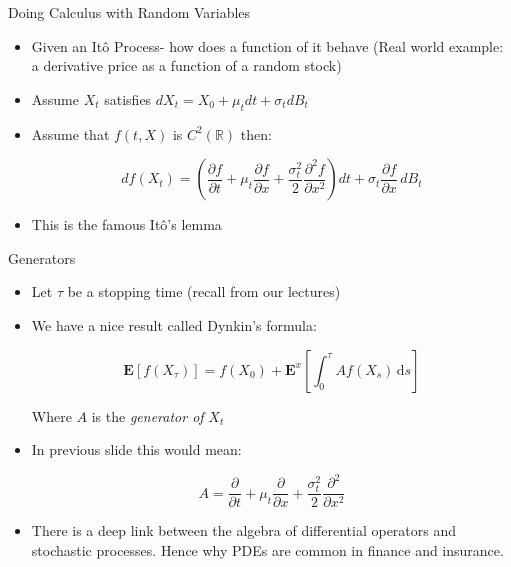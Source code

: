 \documentclass[11pt]{beamer}
\begin{document}
\begin{frame}{Doing Calculus with Random Variables}

\begin{itemize}

\item Given an It\^{o} Process- how does a function of it behave (Real world example: a derivative price as a function of a random stock)
\vfill
\item Assume $X_t$ satisfies $ dX_{t}=X_{0}+ \mu _{t}dt + \sigma _{t}dB_{t} $
\vfill
\item Assume that $f(t,X)$ is $C^2(\mathbb{R})$ then:

    $$df(X_t)=\left({\frac {\partial f}{\partial t}}+\mu _{t}{\frac {\partial f}{\partial x}}+{\frac {\sigma _{t}^{2}}{2}}{\frac {\partial ^{2}f}{\partial x^{2}}}\right)dt+\sigma _{t}{\frac {\partial f}{\partial x}}\,dB_{t}$$
\vfill

\item This is the famous It\^{o}'s lemma

\end{itemize}

\end{frame}
\begin{frame}{Generators} 

\begin{itemize}

\item Let $\tau$ be a stopping time (recall from our lectures)
\vfill
\item We have a nice result called Dynkin's formula:

$$\mathbf{E} [f(X_{\tau})] = f(X_0) + \mathbf{E}^{x} \left[ \int_{0}^{\tau} A f (X_{s}) \, \mathrm{d} s \right] $$

Where $A$ is the \emph{generator of} $X_t$
\vfill
\item In previous slide this would mean: 

$$A = {\frac {\partial }{\partial t}}+\mu _{t}{\frac {\partial }{\partial x}}+{\frac {\sigma _{t}^{2}}{2}}{\frac {\partial ^{2}}{\partial x^{2}}} $$
\vfill
\item There is a deep link between the algebra of differential operators and stochastic processes. Hence why PDEs are common in finance and insurance. 

\end{itemize}

\end{frame}
\end{document}

